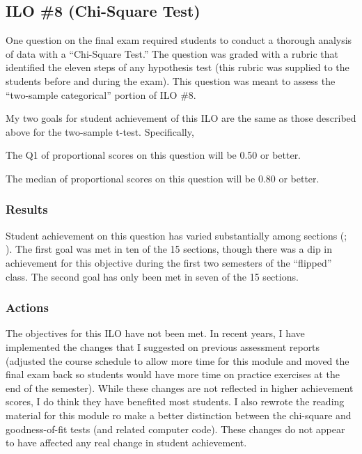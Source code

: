 \documentclass{article}\usepackage[]{graphicx}\usepackage[]{color}
\begin{document}
\clearpage
\subsection{ILO \#8 (Chi-Square Test)}
One question on the final exam required students to conduct a thorough analysis of data with a ``Chi-Square Test.''  The question was graded with a rubric that identified the eleven steps of any hypothesis test (this rubric was supplied to the students before and during the exam). This question was meant to assess the ``two-sample categorical'' portion of ILO \#8.

My two goals for student achievement of this ILO are the same as those described above for the two-sample t-test. Specifically,

\begin{Enumerate}
  \item The Q1 of proportional scores on this question will be 0.50 or better.
  \item The median of proportional scores on this question will be 0.80 or better.
\end{Enumerate}

\subsubsection{Results}
\vspace{-12pt}


Student achievement on this question has varied substantially among sections (; ). The first goal was met in ten of the 15 sections, though there was a dip in achievement for this objective during the first two semesters of the ``flipped'' class. The second goal has only been met in seven of the 15 sections.

\subsubsection{Actions}
\vspace{-12pt}
The objectives for this ILO have not been met. In recent years, I have implemented the changes that I suggested on previous assessment reports (adjusted the course schedule to allow more time for this module and moved the final exam back so students would have more time on practice exercises at the end of the semester). While these changes are not reflected in higher achievement scores, I do think they have benefited most students. I also rewrote the reading material for this module ro make a better distinction between the chi-square and goodness-of-fit tests (and related computer code). These changes do not appear to have affected any real change in student achievement.
\vspace{12pt}
\end{document}
